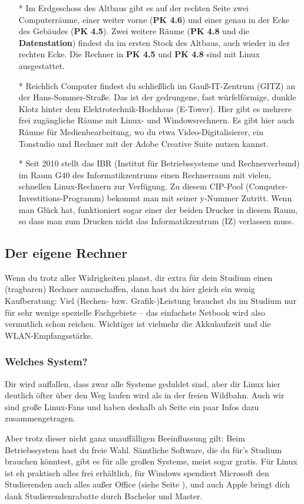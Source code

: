 			\begin{itemize}
				\item[*] Im Erdgeschoss des Altbaus gibt es auf der rechten Seite zwei Computerräume, einer weiter vorne (\textbf{PK 4.6}) und einer genau in der Ecke des Gebäudes (\textbf{PK 4.5}). Zwei weitere Räume (\textbf{PK 4.8} und die \textbf{Datenstation}) findest du im ersten Stock des Altbaus, auch wieder in der rechten Ecke. Die Rechner in \textbf{PK 4.5} und \textbf{PK 4.8} sind mit Linux ausgestattet.

				\item[*] Reichlich Computer findest du schließlich im Gauß-IT-Zentrum (GITZ) an der Hans-Sommer-Straße. Das ist der gedrungene, fast würfelförmige, dunkle Klotz hinter dem Elektrotechnik-Hochhaus (E-Tower). Hier gibt es mehrere frei zugängliche Räume mit Linux- und Windowsrechnern. Es gibt hier auch Räume für Medienbearbeitung, wo du etwa Video-Digitalisierer, ein Tonstudio und Rechner mit der Adobe Creative Suite nutzen kannst.

				\item[*] Seit 2010 stellt das IBR (Institut für Betriebssysteme und Rechnerverbund) im Raum G40 des Informatikzentrums einen Rechnerraum mit vielen, schnellen Linux-Rechnern  zur Verfügung. Zu diesem CIP-Pool (Computer-Investitions-Programm) bekommt man mit seiner y-Nummer Zutritt. Wenn man Glück hat, funktioniert sogar einer der beiden Drucker in diesem Raum, so dass man zum Drucken nicht das Informatikzentrum (IZ) verlassen muss.
			\end{itemize}

		\subsection{Der eigene Rechner}
			Wenn du trotz aller Widrigkeiten planst, dir extra für dein Studium einen (tragbaren) Rechner anzuschaffen, dann hast du hier gleich ein wenig Kaufberatung: Viel (Rechen- bzw. Grafik-)Leistung brauchst du im Studium  nur für sehr wenige spezielle Fachgebiete -- das einfachste Netbook wird also vermutlich schon reichen. Wichtiger ist vielmehr die Akkulaufzeit und die WLAN-Empfangsstärke.

		\subsubsection{Welches System?}
			Dir wird auffallen, dass zwar alle Systeme geduldet sind, aber dir Linux hier deutlich öfter über den Weg laufen wird als in der freien Wildbahn. Auch wir sind große Linux-Fans und haben deshalb ab Seite \pageref{linux} ein paar Infos dazu zusammengetragen.

			Aber trotz dieser nicht ganz unauffälligen Beeinflussung gilt: Beim Betriebssystem hast du freie Wahl. Sämtliche Software, die du für's Studium brauchen  könntest, gibt es für alle großen Systeme, meist sogar gratis. Für Linux ist eh  praktisch alles frei erhältlich, für Windows spendiert Microsoft den Studierenden auch alles außer Office (siehe Seite \pageref{msdnaa}), und auch Apple bringt dich dank Studierendenrabatte durch Bachelor und Master.